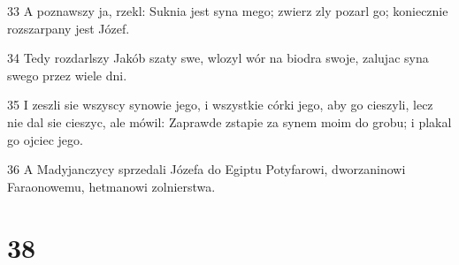 \par 33 A poznawszy ja, rzekl: Suknia jest syna mego; zwierz zly pozarl go; koniecznie rozszarpany jest Józef.
\par 34 Tedy rozdarlszy Jakób szaty swe, wlozyl wór na biodra swoje, zalujac syna swego przez wiele dni.
\par 35 I zeszli sie wszyscy synowie jego, i wszystkie córki jego, aby go cieszyli, lecz nie dal sie cieszyc, ale mówil: Zaprawde zstapie za synem moim do grobu; i plakal go ojciec jego.
\par 36 A Madyjanczycy sprzedali Józefa do Egiptu Potyfarowi, dworzaninowi Faraonowemu, hetmanowi zolnierstwa.

\chapter{38}

